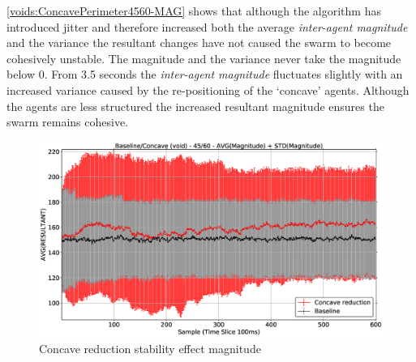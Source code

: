 \autoref{voids:ConcavePerimeter4560-MAG} shows that although the algorithm has introduced jitter and therefore increased both the average \textit{inter-agent magnitude} and the variance the resultant changes have not caused the swarm to become cohesively unstable. The magnitude and the variance never take the magnitude below 0. From 3.5 seconds the \textit{inter-agent magnitude} fluctuates slightly with an increased variance caused by the re-positioning of the `concave' agents. Although the agents are less structured the increased resultant magnitude ensures the swarm remains cohesive. 
\begin{figure}[H]
\begin{center}
\includegraphics[width=15cm]{CHAPTER-7/figures/ConcavePerimeter4560-MAG}
\end{center}
\caption{Concave reduction stability effect magnitude\label{voids:ConcavePerimeter4560-MAG}}
\end{figure}

